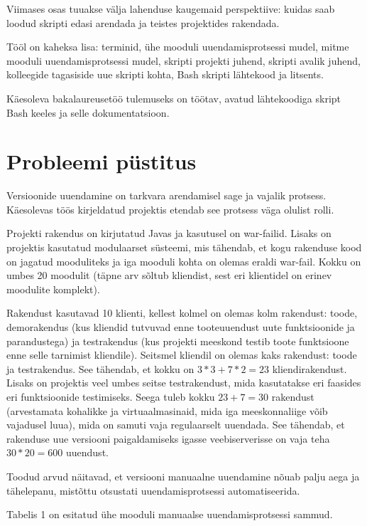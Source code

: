 \documentclass[12pt]{article}
\begin{document}
  Viimases osas tuuakse välja lahenduse kaugemaid perspektiive: kuidas saab loodud skripti edasi arendada ja teistes projektides rakendada.
  
  Tööl on kaheksa lisa: terminid, ühe mooduli uuendamisprotsessi mudel, mitme mooduli uuendamisprotsessi mudel, skripti projekti juhend, skripti avalik juhend, kolleegide tagasiside uue skripti kohta, Bash skripti lähtekood ja litsents.
  
  Käesoleva bakalaureusetöö tulemuseks on töötav, avatud lähtekoodiga skript Bash keeles ja selle dokumentatsioon.
  
  \newpage
  
  \section{Probleemi püstitus}
  
  Versioonide uuendamine on tarkvara arendamisel sage ja vajalik protsess. Käes\-olevas töös kirjeldatud projektis etendab see protsess väga olulist rolli.
  
  Projekti rakendus on kirjutatud Javas ja kasutusel on war\--failid. Lisaks on projektis kasutatud modulaarset süsteemi, mis tähendab, et kogu rakenduse kood on jagatud mooduliteks ja iga mooduli kohta on olemas eraldi war\--fail. Kokku on umbes 20 moodulit (täpne arv sõltub kliendist, sest eri klientidel on erinev moodulite komplekt).
  
  Rakendust kasutavad 10 klienti, kellest kolmel on olemas kolm rakendust: toode, demorakendus (kus kliendid tutvuvad enne tooteuuendust uute funktsioonide ja parandustega) ja testrakendus (kus projekti meeskond testib toote funktsioone enne selle tarnimist kliendile). Seitsmel kliendil on olemas kaks rakendust: toode ja testrakendus. See tähendab, et kokku on $3*3+7*2=23$ kliendirakendust. Lisaks on projektis veel umbes seitse testrakendust, mida kasutatakse eri faasides eri funktsioonide testimiseks. Seega tuleb kokku $23+7=30$ rakendust (arvestamata kohalikke ja virtuaalmasinaid, mida iga meeskonnaliige võib vajadusel luua), mida on samuti vaja regulaarselt uuendada. See tähendab, et rakenduse uue versiooni paigaldamiseks igasse veebiserverisse on vaja teha $30*20=600$ uuendust.
  
  Toodud arvud näitavad, et versiooni manuaalne uuendamine nõuab palju aega ja tähelepanu, mistõttu otsustati uuendamisprotsessi automatiseerida.
    
  Tabelis 1 on esitatud ühe mooduli manuaalse uuendamisprotsessi sammud.
  
\end{document}
